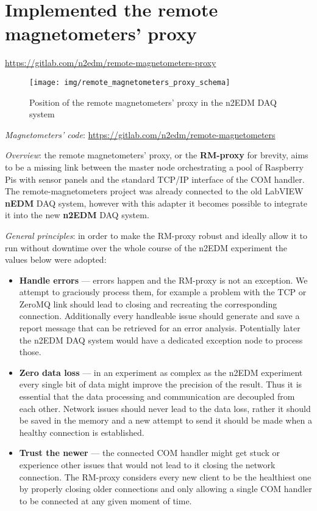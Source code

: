 \section{Implemented the remote magnetometers' proxy}
\label{sec:rm-proxy}

\url{https://gitlab.com/n2edm/remote-magnetometers-proxy}

\begin{figure}[h]
	\texttt{[image: img/remote\_magnetometers\_proxy\_schema]}
	\caption{Position of the remote magnetometers' proxy in the n2EDM DAQ system}
	\label{fig:rm-proxy_position}
\end{figure}

\textit{Magnetometers' code}: \url{https://gitlab.com/n2edm/remote-magnetometers}

\textit{Overview}: the remote magnetometers' proxy, or the \textbf{RM-proxy} for brevity, aims to be a missing link between the master node orchestrating a pool of Raspberry Pis with sensor panels and the standard TCP/IP interface of the COM handler. The remote-magnetometers project was already connected to the old LabVIEW \textbf{nEDM} DAQ system, however with this adapter it becomes possible to integrate it into the new \textbf{n2EDM} DAQ system.

\textit{General principles}: in order to make the RM-proxy robust and ideally allow it to run without downtime over the whole course of the n2EDM experiment the values below were adopted:

\begin{itemize}
	\item \textbf{Handle errors} --- errors happen and the RM-proxy is not an exception. We attempt to graciously process them, for example a problem with the TCP or ZeroMQ link should lead to closing and recreating the corresponding connection. Additionally every handleable issue should generate and save a report message that can be retrieved for an error analysis. Potentially later the n2EDM DAQ system would have a dedicated exception node to process those.
	\item \textbf{Zero data loss} --- in an experiment as complex as the n2EDM experiment every single bit of data might improve the precision of the result. Thus it is essential that the data processing and communication are decoupled from each other. Network issues should never lead to the data loss, rather it should be saved in the memory and a new attempt to send it should be made when a healthy connection is established.
	\item \textbf{Trust the newer} --- the connected COM handler might get stuck or experience other issues that would not lead to it closing the network connection. The RM-proxy considers every new client to be the healthiest one by properly closing older connections and only allowing a single COM handler to be connected at any given moment of time.
\end{itemize}

